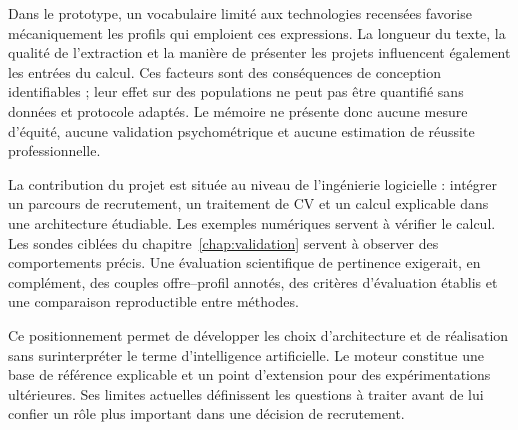 Dans le prototype, un vocabulaire limité aux technologies recensées favorise mécaniquement les profils qui emploient ces expressions. La longueur du texte, la qualité de l'extraction et la manière de présenter les projets influencent également les entrées du calcul. Ces facteurs sont des conséquences de conception identifiables ; leur effet sur des populations ne peut pas être quantifié sans données et protocole adaptés. Le mémoire ne présente donc aucune mesure d'équité, aucune validation psychométrique et aucune estimation de réussite professionnelle.

La contribution du projet est située au niveau de l'ingénierie logicielle : intégrer un parcours de recrutement, un traitement de CV et un calcul explicable dans une architecture étudiable. Les exemples numériques servent à vérifier le calcul. Les sondes ciblées du chapitre~\ref{chap:validation} servent à observer des comportements précis. Une évaluation scientifique de pertinence exigerait, en complément, des couples offre--profil annotés, des critères d'évaluation établis et une comparaison reproductible entre méthodes.

Ce positionnement permet de développer les choix d'architecture et de réalisation sans surinterpréter le terme d'intelligence artificielle. Le moteur constitue une base de référence explicable et un point d'extension pour des expérimentations ultérieures. Ses limites actuelles définissent les questions à traiter avant de lui confier un rôle plus important dans une décision de recrutement.
